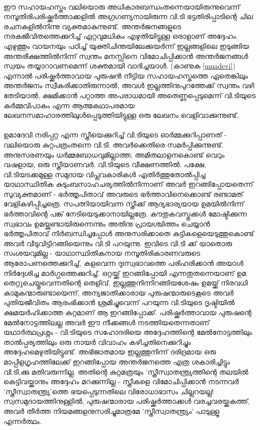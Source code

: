 \paragraph{}ഈ സഹായഹസ്തം വലിയൊരു അധികാരബന്ധംതന്നെയായിരുന്നുവെന്ന് നമ്പൂതിരിപരിഷ്ക്കർത്താക്കളിൽ അഗ്രഗണ്യനായിരുന്ന വി.ടി ഭട്ടതിരിപ്പാടിന്റെ ചില രചനകളിൽനിന്നു വ്യക്തമാകുന്നുണ്ട്. അന്തർജനങ്ങളുടെ നരകജീവിതത്തെക്കുറിച്ച് ഏറ്റവുമധികം എഴുതിയിട്ടുള്ള ഒരാളാണ് അദ്ദേഹം. എഴുത്തും വായനയും പഠിച്ച് യുക്തിചിന്തയിലേക്കുയർന്ന് ഇല്ലങ്ങളിലെ ഇടുങ്ങിയ അന്തരീക്ഷത്തിൽനിന്ന് സ്വന്തം മനസ്സിനെ വിമോചിപ്പിക്കാൻ അന്തർജനങ്ങൾ സ്വയം തയ്യാറാവണമെന്ന് ശക്തമായി വാദിച്ചയാൾ. (കാണുക \ref{umadevi}) എന്നാൽ പരിഷ്ക്കർത്താവായ പുരുഷൻ നീട്ടിയ സഹായഹസ്തത്തെ ഏതെങ്കിലും അന്തർജനം സ്വീകരിക്കാതിരുന്നാൽ, അവൾ ഇല്ലത്തിനുപുറത്തേക്ക് സ്വന്തം വഴി തേടിയാൽ, ക്ഷമിക്കാൻ പറ്റാത്ത അപരാധമായി അതെണ്ണപ്പെടുമെന്ന് വി.ടിയുടെ കർമ്മവിപാകം എന്ന ആത്മകഥാപരമായ ലേഖനസമാഹാരത്തിലുൾപ്പെടുത്തിയിട്ടുള്ള ഒരു ലേഖനം വെളിവാക്കുന്നുണ്ട്. 

\paragraph{}
\label{uma-vt}
	ഉമാദേവി നരിപ്പറ്റ എന്ന സ്ത്രീയെക്കുറിച്ച് വി.ടിയുടെ ഓർമ്മക്കുറിപ്പാണത് - വലിയൊരു കുറ്റപത്രംതന്നെ വി.ടി. അവർക്കെതിരെ സമർപ്പിക്കുന്നുണ്ട്. അനുസരണയും ധർമ്മബോധവുമില്ലാത്ത, അമിതലാളനകൊണ്ട് വെറും വഷളായ, ഒരു സ്ത്രീയാണവർ, വി.ടിയുടെ വീക്ഷണത്തിൽ. പക്ഷേ, വി.ടിയടക്കമുള്ള സമുദായ വിപ്ലവകാരികൾ എതിർത്തുതോൽപ്പിച്ച യാഥാസ്ഥിതിക കുടുംബസാഹചര്യത്തിൽനിന്നാണ് അവർ ഇറങ്ങിപ്പോയതെന്ന് സുവ്യക്തമാണ് - ഭർത്തൃപിതാവ് അവരുടെ ഭർത്താവിനെക്കൊണ്ട് രണ്ടാമത് വേളികഴിപ്പിച്ചത്രെ. സപത്നിയായിവന്ന സ്ത്രീക്ക് ആദ്യഭാര്യയായ ഉമയിൽനിന്ന് ഭർത്താവിന്റെ പങ്ക് നേടിയെടുക്കാനായില്ലത്രേ. കൗതുകവസ്തുക്കൾ മോഷ്ടിക്കുന്ന സ്വഭാവം ഉമയ്ക്കുണ്ടായിരുന്നെന്നും അതിനു പ്രായശ്ചിത്തം ചെയ്യാൻ ഭർത്തൃപിതാവ് നിർബന്ധിച്ചപ്പോൾ അനുസരിക്കാതെ കുട്ടികളെയെടുത്തുകൊണ്ട് അവർ വീടുവിട്ടിറങ്ങിയെന്നും വി.ടി പറയുന്നു. ഇവിടെ വി.ടി ക്ക് യാതൊരു സംശയവുമില്ല - യാഥാസ്ഥിതികനായ നമ്പൂതിരികാരണവരുടെ ആരോപണത്തെക്കുറിച്ച്, കളവെന്ന ദുഃസ്വഭാവത്തെ പരിഹരിക്കാൻ അയാൾ നിർദ്ദേശിച്ച മാർഗ്ഗത്തെക്കുറിച്ച്. ഒറ്റയ്ക്ക് ഇറങ്ങിപ്പോയി എന്നതുതന്നെയാണ് ഉമ തെറ്റുചെയ്തുവെന്നതിന്റെ തെളിവ്. ഇല്ലത്തുനിന്നിറങ്ങിയശേഷം ഉമയ്ക്ക് നിരവധി കാമുകന്മാരുണ്ടായെന്ന്, അന്യജാതിക്കാരായ പുരുഷന്മാരുടെകൂടെ അവർ പുതിയജീവിതം ആരംഭിക്കാൻ ശ്രമിച്ചുവെന്ന് പറയുന്ന വി.ടിയുടെ ദൃഷ്ടിയിൽ ക്ഷമയർഹിക്കാത്ത കുറ്റമാണ് ആ ഇറങ്ങിപ്പോക്ക്. പരിഷ്ക്കർത്താവായ പുരുഷന്റെ മേൽനോട്ടത്തിലല്ല അവർ ഈ നീക്കങ്ങൾ നടത്തിയതെന്നതാണ് യഥാർത്ഥപ്രശ്നം - വി.ടിയുടെ സഹോദരിയെ അദ്ദേഹത്തിന്റെ മേൽനോട്ടത്തിലും താൽപ്പര്യത്തിലും ഒരു നായർ വിവാഹം കഴിച്ചതിനെക്കുറിച്ചും അദ്ദേഹമെഴുതിയിട്ടുണ്ട്. അഭിജാതമായ ഇല്ലത്തുനിന്ന് ദരിദ്രമായ ഒരു മാപ്പിളഗൃഹത്തിലേക്ക് ഇറങ്ങിപ്പോയ അന്തർജനത്തെ എത്ര ശകാരിച്ചിട്ടും വി.ടി.ക്കു മതിവരുന്നില്ല. അതിന്റെ കുറ്റമത്രയും 'സ്ത്രീസ്വാതന്ത്ര്യത്തിന്റെ തലയിൽ കെട്ടിവയ്ക്കാനും അദ്ദേഹം മറക്കുന്നില്ല - സ്ത്രീകളെ വിമോചിപ്പിക്കാൻ നടന്നവർ 'സ്ത്രീസ്വാതന്ത്ര്യ'ത്തെ ഭയപ്പെടുന്നതിലെ വിരോധാഭാസം ചില്ലറയല്ല! സ്വസമുദായത്തിനുള്ളിൽ, പുരുഷന്മാരായ പരിഷ്ക്കർത്താക്കൾ വരച്ചവരയ്ക്കകത്ത്, അവർ തീർത്ത നിയമങ്ങളനുസരിച്ചുമാത്രമേ 'സ്ത്രീസ്വാതന്ത്ര്യം' പാടുള്ളൂ എന്നർത്ഥം.


